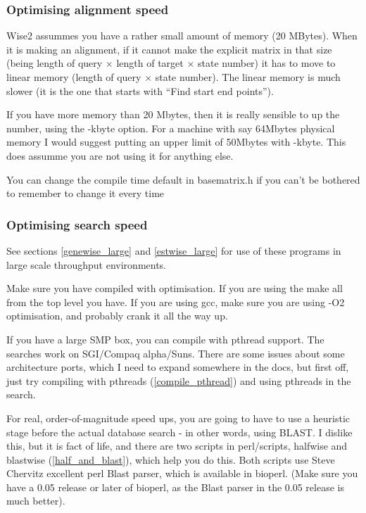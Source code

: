 \documentclass{article}
\begin{document}
\subsubsection{Optimising alignment speed}

Wise2 assummes you have a rather small amount of memory (20 MBytes).
When it is making an alignment, if it cannot make the explicit matrix
in that size (being length of query $\times$ length of target $\times$
state number) it has to move to linear memory (length of query
$\times$ state number). The linear memory is much slower (it is the
one that starts with ``Find start end points'').

If you have more memory than 20 Mbytes, then it is really sensible to
up the number, using the -kbyte option. For a machine with say
64Mbytes physical memory I would suggest putting an upper limit of
50Mbytes with -kbyte. This does assumme you are not using it for
anything else.

You can change the compile time default in basematrix.h if you can't
be bothered to remember to change it every time

\subsubsection{Optimising search speed}

See sections \ref{genewise_large} and \ref{estwise_large} for use of
these programs in large scale throughput environments.

Make sure you have compiled with optimisation. If you are using the
make all from the top level you have. If you are using gcc, make
sure you are using -O2 optimisation, and probably crank it all the
way up.

If you have a large SMP box, you can compile with pthread support. The
searches work on SGI/Compaq alpha/Suns. There are some issues about some
architecture ports, which I need to expand somewhere in the docs, but first
off, just try compiling with pthreads (\ref{compile_pthread}) and using pthreads
in the search.

For real, order-of-magnitude speed ups, you are going to have to use a
heuristic stage before the actual database search - in other words,
using BLAST. I dislike this, but it is fact of life, and there are two
scripts in perl/scripts, halfwise and blastwise
(\ref{half_and_blast}), which help you do this. Both scripts use Steve
Chervitz excellent perl Blast parser, which is available in
bioperl. (Make sure you have a 0.05 release or later of bioperl, as
the Blast parser in the 0.05 release is much better).
\end{document}
